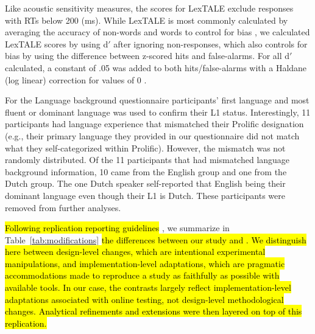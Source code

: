 Like acoustic sensitivity measures, the scores for LexTALE exclude responses with RTs below 200 (ms). While LexTALE is most commonly calculated by averaging the accuracy of non-words and words to control for bias \parencite{lemhofer2012introducing}, we calculated LexTALE scores by using d$'$ after ignoring non-responses, which also controls for bias by using the difference between z-scored hits and false-alarms. For all d$'$ calculated, a constant of .05 was added to both hits/false-alarms with a Haldane (log linear) correction for values of 0 \parencite{Hautus1995}. 

For the Language background questionnaire participants' first language and most fluent or dominant language was used to confirm their L1 status. Interestingly, 11 participants had language experience that mismatched their Prolific designation (e.g., their primary language they provided in our questionnaire did not match what they self-categorized within Prolific). However, the mismatch was not randomly distributed. Of the 11 participants that had mismatched language background information, 10 came from the English group and one from the Dutch group. The one Dutch speaker self-reported that English being their dominant language even though their L1 is Dutch. These participants were removed from further analyses.

\hl{Following replication reporting guidelines }\parencite{mcmanus2024}, we
summarize in Table~\ref{tab:modifications} \hl{the differences between our study and \parencite{ge2021a}. We distinguish here between design-level changes, which are intentional experimental manipulations, and implementation-level adaptations, which are pragmatic accommodations made to reproduce a study as faithfully as possible with available tools. In our case, the contrasts largely reflect implementation-level adaptations associated with online testing, not design-level methodological changes. Analytical refinements and extensions were then layered on top of this replication.}

\begin{table}[h]
    \centering
    \renewcommand{\arraystretch}{1.3}
    \caption{Key differences between Ge et al. (2021a) and the present replication.}
    \label{tab:modifications}
\end{table}